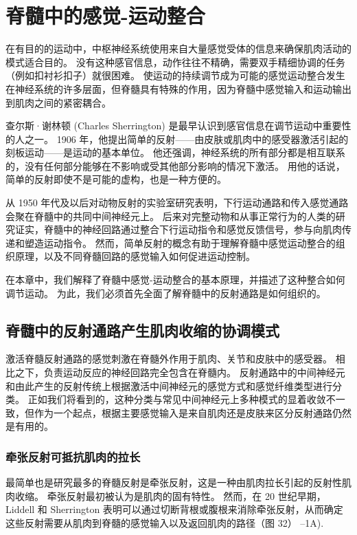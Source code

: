 \chapter{脊髓中的感觉-运动整合} \label{chap:chap32}
在有目的的运动中，中枢神经系统使用来自大量感觉受体的信息来确保肌肉活动的模式适合目的。 没有这种感官信息，动作往往不精确，需要双手精细协调的任务（例如扣衬衫扣子）就很困难。 使运动的持续调节成为可能的感觉运动整合发生在神经系统的许多层面，但脊髓具有特殊的作用，因为脊髓中感觉输入和运动输出到肌肉之间的紧密耦合。

查尔斯·谢林顿 (Charles Sherrington) 是最早认识到感官信息在调节运动中重要性的人之一。 1906 年，他提出简单的反射——由皮肤或肌肉中的感受器激活引起的刻板运动——是运动的基本单位。 他还强调，神经系统的所有部分都是相互联系的，没有任何部分能够在不影响或受其他部分影响的情况下激活。 用他的话说，简单的反射即使不是可能的虚构，也是一种方便的。

从 1950 年代及以后对动物反射的实验室研究表明，下行运动通路和传入感觉通路会聚在脊髓中的共同中间神经元上。 后来对完整动物和从事正常行为的人类的研究证实，脊髓中的神经回路通过整合下行运动指令和感觉反馈信号，参与向肌肉传递和塑造运动指令。 然而，简单反射的概念有助于理解脊髓中感觉运动整合的组织原理，以及不同脊髓回路的感觉输入如何促进运动控制。

在本章中，我们解释了脊髓中感觉-运动整合的基本原理，并描述了这种整合如何调节运动。 为此，我们必须首先全面了解脊髓中的反射通路是如何组织的。

\section{脊髓中的反射通路产生肌肉收缩的协调模式}
激活脊髓反射通路的感觉刺激在脊髓外作用于肌肉、关节和皮肤中的感受器。 相比之下，负责运动反应的神经回路完全包含在脊髓内。 反射通路中的中间神经元和由此产生的反射传统上根据激活中间神经元的感觉方式和感觉纤维类型进行分类。 正如我们将看到的，这种分类与常见中间神经元上多种模式的显着收敛不一致，但作为一个起点，根据主要感觉输入是来自肌肉还是皮肤来区分反射通路仍然是有用的。

\subsection{牵张反射可抵抗肌肉的拉长}

最简单也是研究最多的脊髓反射是牵张反射，这是一种由肌肉拉长引起的反射性肌肉收缩。 牵张反射最初被认为是肌肉的固有特性。 然而，在 20 世纪早期，Liddell 和 Sherrington 表明可以通过切断背根或腹根来消除牵张反射，从而确定这些反射需要从肌肉到脊髓的感觉输入以及返回肌肉的路径（图 32） –1A).

